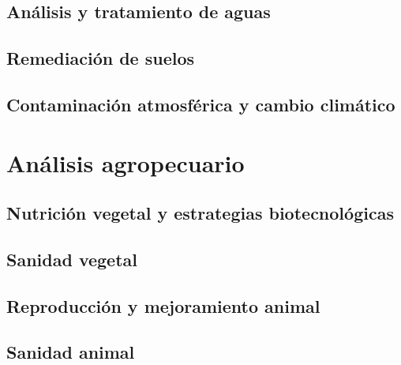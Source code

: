 \documentclass{AsignaturaResumen}
\begin{document}
    \chapter{Análisis y tratamiento de aguas} 
    \chapter{Remediación de suelos} 
    \chapter{Contaminación atmosférica y cambio climático} 

\part{Análisis agropecuario}

    \chapter{Nutrición vegetal y estrategias biotecnológicas} 
    \chapter{Sanidad vegetal} 
    \chapter{Reproducción y mejoramiento animal} 
    \chapter{Sanidad animal} 
   



    \PlainGeom
    \appendix



    \backmatter

\Bibliografia
\Glosarios
\end{document}
